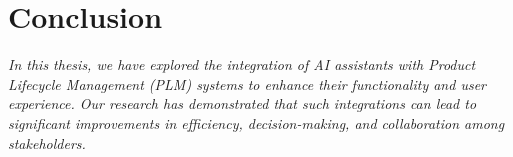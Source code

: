 \chapter{Conclusion}
\label{ch:conclusion}

\textit{In this thesis, we have explored the integration of AI assistants with Product Lifecycle Management (PLM) systems to enhance their functionality and user experience. Our research has demonstrated that such integrations can lead to significant improvements in efficiency, decision-making, and collaboration among stakeholders.}